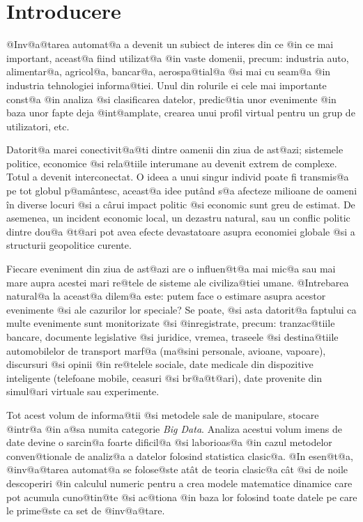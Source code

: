 

\chapter*{Introducere}
\label{capintro}

@Inv@a@tarea automat@a a devenit un subiect de interes din ce @in ce mai important, aceast@a fiind utilizat@a @in vaste domenii, precum: industria auto, alimentar@a, agricol@a, bancar@a, aerospa@tial@a @si mai cu seam@a @in industria tehnologiei informa@tiei. Unul din rolurile ei cele mai importante const@a @in analiza @si clasificarea datelor, predic@tia unor evenimente @in baza unor fapte deja @int@amplate, crearea unui profil virtual pentru un grup de utilizatori, etc.

Datorit@a marei conectivit@a@ti dintre oamenii din ziua de ast@azi; sistemele politice, economice @si rela@tiile interumane au devenit extrem de complexe. Totul a devenit interconectat. O ideea a unui singur individ poate fi transmis@a pe tot globul p@am\^ antesc, aceast@a idee put\^ and s@a afecteze milioane de oameni \^ in diverse locuri @si a c\^ arui impact politic @si economic sunt greu de estimat. De asemenea, un incident economic local, un dezastru natural, sau un conflic politic dintre dou@a @t@ari pot avea efecte devastatoare asupra economiei globale @si a structurii geopolitice curente.

Fiecare eveniment din ziua de ast@azi are o influen@t@a mai mic@a sau mai mare aupra acestei mari re@tele de sisteme ale civiliza@tiei umane. @Intrebarea natural@a la aceast@a dilem@a este: putem face o estimare asupra acestor evenimente @si ale cazurilor lor speciale? Se poate, @si asta datorit@a faptului ca multe evenimente sunt monitorizate @si @inregistrate, precum: tranzac@tiile bancare, documente legislative @si juridice, vremea, traseele @si destina@tiile automobilelor de transport marf@a (ma@sini personale, avioane, vapoare), discursuri @si opinii @in re@telele sociale, date medicale din dispozitive inteligente (telefoane mobile, ceasuri @si br@a@t@ari), date provenite din simul@ari virtuale sau experimente. 

Tot acest volum de informa@tii @si metodele sale de manipulare, stocare @intr@a @in a@sa numita categorie {\sl Big Data}. Analiza acestui volum imens de date devine o sarcin@a foarte dificil@a @si laborioas@a @in cazul metodelor conven@tionale de analiz@a a datelor folosind statistica clasic@a. @In esen@t@a, @inv@a@tarea automat@a se folose@ste at\^ at de teoria clasic@a c\^  at @si de noile descoperiri @in calculul numeric pentru a crea modele matematice dinamice care pot acumula cuno@tin@te @si ac@tiona @in baza lor folosind toate datele pe care le prime@ste ca set de @inv@a@tare.

